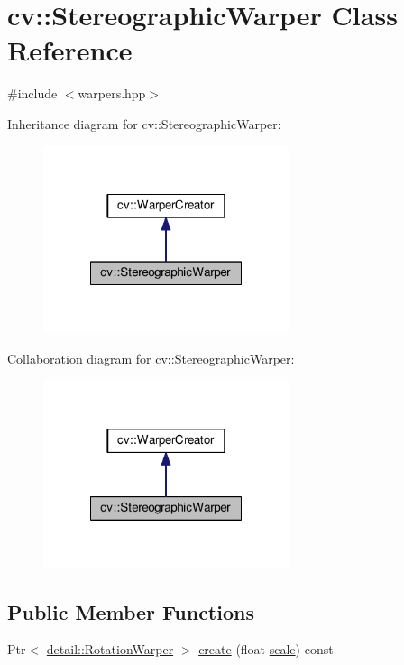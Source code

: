 \hypertarget{classcv_1_1StereographicWarper}{\section{cv\-:\-:Stereographic\-Warper Class Reference}
\label{classcv_1_1StereographicWarper}
}


{\ttfamily \#include $<$warpers.\-hpp$>$}



Inheritance diagram for cv\-:\-:Stereographic\-Warper\-:\nopagebreak
\begin{figure}[H]
\begin{center}
\leavevmode
\includegraphics[width=204pt]{classcv_1_1StereographicWarper__inherit__graph}
\end{center}
\end{figure}


Collaboration diagram for cv\-:\-:Stereographic\-Warper\-:\nopagebreak
\begin{figure}[H]
\begin{center}
\leavevmode
\includegraphics[width=204pt]{classcv_1_1StereographicWarper__coll__graph}
\end{center}
\end{figure}
\subsection*{Public Member Functions}
\begin{DoxyCompactItemize}
\item 
Ptr$<$ \hyperlink{classcv_1_1detail_1_1RotationWarper}{detail\-::\-Rotation\-Warper} $>$ \hyperlink{classcv_1_1StereographicWarper_a158bbaedb997829456e6271e718d6ccd}{create} (float \hyperlink{objdetect_8hpp_a1f622eb9b9e06b30862ca90cdf2c078b}{scale}) const 
\end{DoxyCompactItemize}


